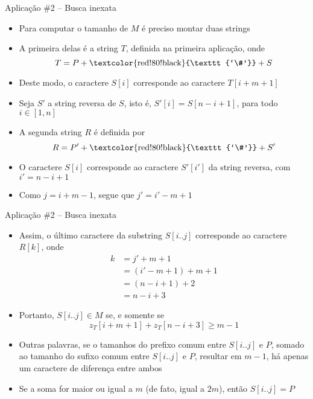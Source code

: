 \begin{frame}[fragile]{Aplicação \#2 -- Busca inexata}

    \begin{itemize}
        \item Para computar o tamanho de $M$ é preciso montar duas strings

        \item A primeira delas é a string $T$, definida na primeira aplicação, onde
         \[
            T = P + \mbox{\textcolor{red!80!black}{\texttt{`\#'}}} + S
        \]

        \item Deste modo, o caractere $S[i]$ corresponde ao caractere $T[i + m + 1]$

        \item Seja $S'$ a string reversa de $S$, isto é, $S'[i] = S[n - i + 1]$, para todo
            $i\in [1,n]$

        \item A segunda string $R$ é definida por
         \[
            R = P' + \mbox{\textcolor{red!80!black}{\texttt{`\#'}}} + S'
        \]

        \item O caractere $S[i]$ corresponde ao caractere $S'[i']$ da string 
            reversa, com $i' = n - i + 1$

        \item Como $j = i + m - 1$, segue que $j' = i' - m + 1$ 

    \end{itemize}

\end{frame}

\begin{frame}[fragile]{Aplicação \#2 -- Busca inexata}

    \begin{itemize}
        \item Assim, o último caractere da substring $S[i..j]$ corresponde
            ao caractere $R[k]$, onde
        \begin{align*}
            k &= j' + m + 1 \\
              &= (i' - m + 1) + m + 1 \\
              &= (n - i + 1) + 2 \\
              &= n - i + 3
        \end{align*}

        \item Portanto, $S[i..j]\in M$ se, e somente se
        \[
            z_T[i + m + 1] + z_T[n - i + 3] \geq m - 1
        \]

        \item Outras palavras, se o tamanhos do prefixo comum entre $S[i..j]$ e $P$, somado ao
            tamanho do sufixo comum entre $S[i..j]$ e $P$, resultar em $m - 1$, há apenas um
            caractere de diferença entre ambos

        \item Se a soma for maior ou igual a $m$ (de fato, igual a $2m$),  então $S[i..j] = P$
    \end{itemize}

\end{frame}

